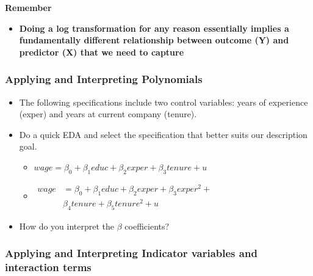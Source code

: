 \documentclass[
]{book}
\providecommand{\tightlist}{%
  \setlength{\itemsep}{0pt}\setlength{\parskip}{0pt}}
\theoremstyle{definition}
\theoremstyle{definition}
\theoremstyle{definition}
\theoremstyle{definition}
\theoremstyle{remark}
\begin{document}
\textbf{Remember}

\begin{itemize}
\tightlist
\item
  \textbf{Doing a log transformation for any reason essentially implies a fundamentally different relationship between outcome (Y) and predictor (X) that we need to capture}
\end{itemize}

\hypertarget{applying-and-interpreting-polynomials}{%
\subsubsection{Applying and Interpreting Polynomials}\label{applying-and-interpreting-polynomials}}

\begin{itemize}
\item
  The following specifications include two control variables: years of experience (exper) and years at current company (tenure).
\item
  Do a quick EDA and select the specification that better suits our description goal.

  \begin{itemize}
  \item
    \(wage = \beta_0 + \beta_1 educ + \beta_2 exper + \beta_3 tenure + u\)
  \item
    \(\begin{aligned} wage &= \beta_0 + \beta_1 educ + \beta_2 exper + \beta_3 exper^2 + \\ & \beta_4 tenure + \beta_5 tenure^2 + u \end{aligned}\)
  \end{itemize}
\item
  How do you interpret the \(\beta\) coefficients?
\end{itemize}

\hypertarget{applying-and-interpreting-indicator-variables-and-interaction-terms}{%
\subsubsection{Applying and Interpreting Indicator variables and interaction terms}\label{applying-and-interpreting-indicator-variables-and-interaction-terms}}
\end{document}
